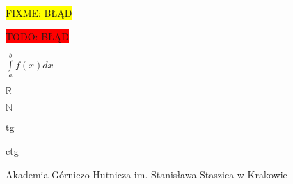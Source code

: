 \documentclass[a4paper,11pt]{article}
\newcommand{\fixme}[1]{\colorbox{yellow}{FIXME: #1}}
\newcommand{\todo}[1]{\colorbox{red}{TODO: #1}}
\newcommand{\myint}[3]{$\int\limits_{#1}^{#2} #3$}
\def \R {$\mathbb R$}
\def \N {$\mathbb N$}
\def \tg {tg}
\def \ctg {ctg}
\def \agh {Akademia Górniczo-Hutnicza im. Stanisława Staszica w Krakowie}
\begin{document}
	\fixme {BŁĄD} 
	
	\todo {BŁĄD}
	
	\myint {a}{b}{f(x)dx}
	
	\R 
	
	\N
	
	\tg
	
	\ctg
	
	\agh
\end{document}

